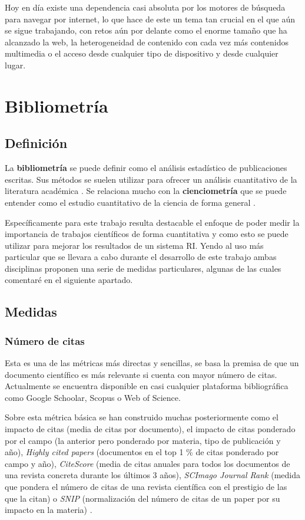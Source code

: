Hoy en día existe una dependencia casi absoluta por los motores de búsqueda para navegar por internet, lo que hace de este un tema tan crucial en el que aún se sigue trabajando, con retos aún por delante como el enorme tamaño que ha alcanzado la web, la heterogeneidad de contenido con cada vez más contenidos multimedia o el acceso desde cualquier tipo de dispositivo y desde cualquier lugar. 

\section{Bibliometría}
\subsection{Definición}
La \textbf{bibliometría} se puede definir como el análisis estadístico de publicaciones escritas. Sus métodos se suelen utilizar para ofrecer un análisis cuantitativo de la literatura académica \cite{de2009bibliometrics}. Se relaciona mucho con la \textbf{cienciometría} que se puede entender como el estudio cuantitativo de la ciencia de forma general \cite{DBLP:journals/corr/abs-1208-4566}. 

Específicamente para este trabajo resulta destacable el enfoque de poder medir la importancia de trabajos científicos de forma cuantitativa y como esto se puede utilizar para mejorar los resultados de un sistema \acrshort{RI}. Yendo al uso más particular que se llevara a cabo durante el desarrollo de este trabajo ambas disciplinas proponen una serie de medidas particulares, algunas de las cuales comentaré en el siguiente apartado.

\subsection{Medidas}
\subsubsection{Número de citas} \label{numero_citas}
Esta es una de las métricas más directas y sencillas, se basa la premisa de que un documento científico es más relevante si cuenta con mayor número de citas. Actualmente se encuentra disponible en casi cualquier plataforma bibliográfica como Google Schoolar, Scopus o Web of Science. 

Sobre esta métrica básica se han construido muchas posteriormente como el impacto de citas (media de citas por documento), el impacto de citas ponderado por el campo (la anterior pero ponderado por materia, tipo de publicación y año), \textit{Highly cited papers} (documentos en el top 1 \% de citas ponderado por campo y año)\cite{BibliometricWhitePaper}, \textit{CiteScore} (media de citas anuales para todos los documentos de una revista concreta durante los últimos 3 años), \textit{SCImago Journal Rank} (medida que pondera el número de citas de una revista científica con el prestigio de las que la citan) o \textit{SNIP} (normalización del número de citas de un paper por su impacto en la materia) \cite{bibliometric_measures}.
